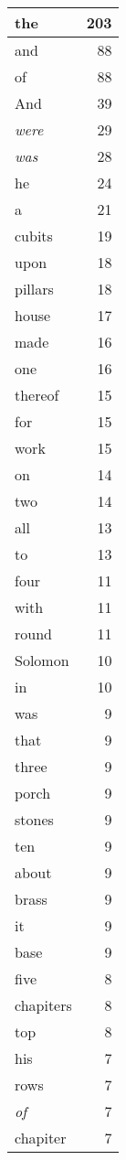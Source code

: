 \begin{center}
\begin{longtable}{l|r}
\hline \hline
\endlastfoot
the & 203 \\ \hline
and & 88 \\ \hline
of & 88 \\ \hline
And & 39 \\ \hline
\emph{were} & 29 \\ \hline
\emph{was} & 28 \\ \hline
he & 24 \\ \hline
a & 21 \\ \hline
cubits & 19 \\ \hline
upon & 18 \\ \hline
pillars & 18 \\ \hline
house & 17 \\ \hline
made & 16 \\ \hline
one & 16 \\ \hline
thereof & 15 \\ \hline
for & 15 \\ \hline
work & 15 \\ \hline
on & 14 \\ \hline
two & 14 \\ \hline
all & 13 \\ \hline
to & 13 \\ \hline
four & 11 \\ \hline
with & 11 \\ \hline
round & 11 \\ \hline
Solomon & 10 \\ \hline
in & 10 \\ \hline
was & 9 \\ \hline
that & 9 \\ \hline
three & 9 \\ \hline
porch & 9 \\ \hline
stones & 9 \\ \hline
ten & 9 \\ \hline
about & 9 \\ \hline
brass & 9 \\ \hline
it & 9 \\ \hline
base & 9 \\ \hline
five & 8 \\ \hline
chapiters & 8 \\ \hline
top & 8 \\ \hline
his & 7 \\ \hline
rows & 7 \\ \hline
\emph{of} & 7 \\ \hline
chapiter & 7 \\ \hline

\end{longtable}
\end{center}
